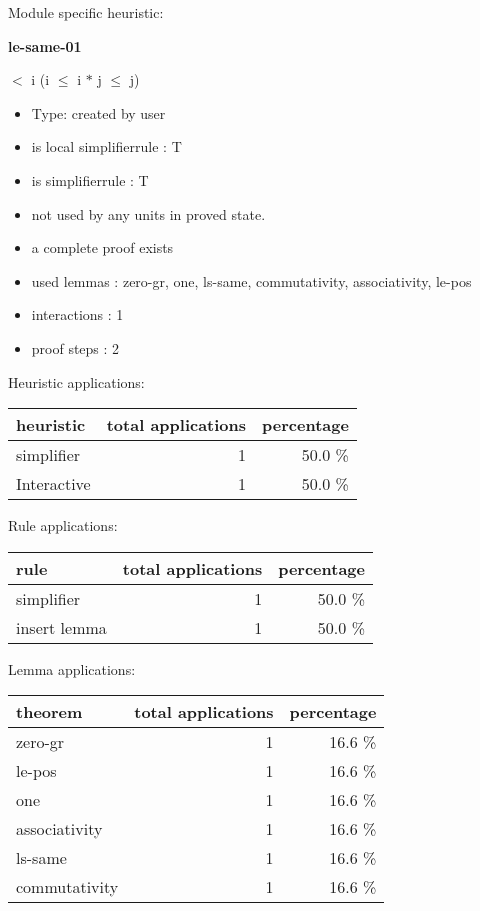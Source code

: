 \documentclass[a4paper]{article}
\begin{document}
Module specific heuristic:

\pagebreak

{\LARGE\bf le-same-01}\label{lemma-le-same-01}

\medskip

  $<$ i \Imp (i $\le$ i $*$ j  $\le$ j)

\begin{itemize}

\item Type: created by user

\item is local simplifierrule : T
\item is simplifierrule : T
\item not used by any units in proved state.
\item       a complete proof exists
\item       used lemmas  : zero-gr, one, ls-same, commutativity, associativity, le-pos
\item       interactions : 1
\item       proof steps  : 2
\end{itemize}

\medskip


Heuristic applications:

\begin{supertabular}{l|r|r}
heuristic	& total applications & percentage \\ \hline
simplifier & 1 & 50.0 \% \\
Interactive & 1 & 50.0 \% \\

\end{supertabular}

Rule applications:

\begin{supertabular}{l|r|r}
rule	        & total applications & percentage \\ \hline
simplifier & 1 & 50.0 \% \\
insert lemma & 1 & 50.0 \% \\

\end{supertabular}

Lemma applications:

\begin{supertabular}{l|r|r}
theorem	        & total applications & percentage \\ \hline
zero-gr & 1 & 16.6 \% \\
le-pos & 1 & 16.6 \% \\
one & 1 & 16.6 \% \\
associativity & 1 & 16.6 \% \\
ls-same & 1 & 16.6 \% \\
commutativity & 1 & 16.6 \% \\

\end{supertabular}
\end{document}

